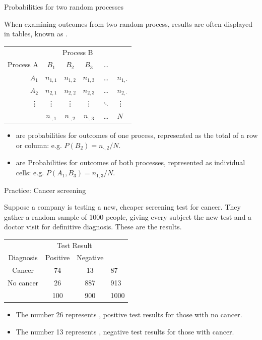 \documentclass[xcolor=table, aspectratio=169, bigger, handout]{beamer}
\begin{document}
\begin{frame}{Probabilities for two random processes}
\begin{block}{}
When examining outcomes from two random process, results are often displayed in tables, known as . \\
\pause\medskip
{\centering
\begin{tabular}{r|cccc|l}
& \multicolumn{4}{c}{Process B}\\
Process A & $B_1$ & $B_2$ & $B_3$ & \ldots \\
\hline
$A_1$ & $n_{1,1}$ & $n_{1,2}$ & $n_{1,3}$ & \ldots & $n_{1,\cdot}$ \\
$A_2$ & $n_{2,1}$ & $n_{2,2}$ & $n_{2,3}$ & \ldots & $n_{2,\cdot}$ \\
\vdots & \vdots & \vdots & \vdots & $\ddots$ & \vdots \\
\hline
& $n_{\cdot,1}$ & $n_{\cdot,2}$ & $n_{\cdot,3}$ & \ldots & $N$ \\
\end{tabular}
\par}\medskip

\begin{itemize}
\pause\item {} are probabilities for outcomes of one process, represented as the total of a row or column: e.g. $P(B_2) = n_{\cdot, 2}/N$.
\pause\item {} are Probabilities for outcomes of both processes, represented as individual cells: e.g. $P(A_1, B_3) = n_{1,3}/N$.
\end{itemize}
\end{block}

\end{frame}

\begin{frame}{Practice: Cancer screening}
\begin{block}{}
Suppose a company is testing a new, cheaper screening test for cancer. They gather a random sample of 1000 people, giving every subject the new test and a doctor visit for definitive diagnosis. These are the results.\\
\medskip
{\centering
\begin{tabular}{c | c  c | l}
\multicolumn{1}{c}{} & \multicolumn{2}{c}{Test Result}\\
Diagnosis & Positive & Negative \\
\hline
Cancer & 74 & 13 & 87\\
No cancer & 26 & 887 & 913\\
\hline
& 100 & 900 & 1000
\end{tabular}\par
}
\smallskip
\begin{itemize}
\pause
\item The number 26 represents , positive test results for those with no cancer.
\pause
\item The number 13 represents , negative test results for those with cancer.
\end{itemize}
\end{block}
\end{frame}
\end{document}
